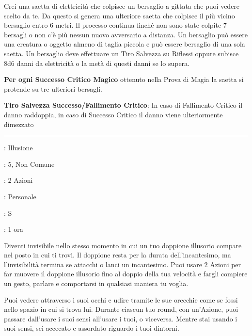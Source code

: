 \begin{multicols}{2}
Crei una saetta di elettricità che colpisce un bersaglio a gittata che puoi vedere scelto da te. Da questo si genera una ulteriore saetta che colpisce il più vicino bersaglio entro 6 metri. Il processo continua finché non sono state colpite 7 bersagli o non c'è più nessun nuovo avversario a distanza. Un bersaglio può essere una creatura o oggetto almeno di taglia piccola e può essere bersaglio di una sola saetta. Un bersaglio deve effettuare un Tiro Salvezza su Riflessi oppure subisce 8d6 danni da elettricità o la metà di questi danni se lo supera.

\textbf{Per ogni Successo Critico Magico} ottenuto nella Prova di Magia la saetta si protende su tre ulteriori bersagli.

\textbf{Tiro Salvezza Successo/Fallimento Critico}: In caso di Fallimento Critico il danno raddoppia, in caso di Successo Critico il danno viene ulteriormente dimezzato

\smallskip\noindent\rule{\linewidth}{2pt} \hypertarget{Fuorviare}{}\smallskip{}
\noindent
\begin{description}[noitemsep, topsep=0pt, parsep=0pt, partopsep=0pt, leftmargin=0cm, labelwidth=2.8cm]
	\item[\textbf{Lista di Magia}]: Illusione
	\item[\textbf{Livello}]: 5, Non Comune
	\item[\textbf{T. di Lancio}]: 2 Azioni
	\item[\textbf{Gittata}]: Personale
	\item[\textbf{Componenti}]: S
	\item[\textbf{Durata}]: 1 ora
\end{description}

Diventi invisibile nello stesso momento in cui un tuo doppione illusorio compare nel posto in cui ti trovi. Il doppione resta per la durata dell'incantesimo, ma l'invisibilità termina se attacchi o lanci un incantesimo. Puoi usare 2 Azioni per far muovere il doppione illusorio fino al doppio della tua velocità e fargli compiere un gesto, parlare e comportarsi in qualsiasi maniera tu voglia.

Puoi vedere attraverso i suoi occhi e udire tramite le sue orecchie come se fossi nello spazio in cui si trova lui. Durante ciascun tuo round, con un'Azione, puoi passare dall'usare i suoi sensi all'usare i tuoi, o viceversa. Mentre stai usando i suoi sensi, sei accecato e assordato riguardo i tuoi dintorni.


\end{multicols}
